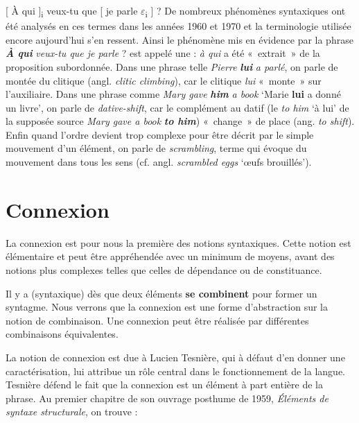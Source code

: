 {    \ea{}
        [ À qui ]{\textsubscript{i}} veux-tu que [ je parle $\varepsilon ${\textsubscript{i}} ] ?
    \z
    De nombreux phénomènes syntaxiques ont été analysés en ces termes dans les années 1960 et 1970 et la terminologie utilisée encore aujourd’hui s’en ressent. Ainsi le phénomène mis en évidence par la phrase \textbf{\textit{À} \textit{qui}} \textit{veux-tu que je parle} ? est appelé une : \textit{à qui} a été «~extrait~» de la proposition subordonnée. Dans une phrase telle \textit{Pierre} \textbf{\textit{lui}} \textit{a parlé}, on parle de montée du clitique (angl. \textit{clitic climbing}), car le clitique \textit{lui} «~monte~» sur l’auxiliaire. Dans une phrase comme \textit{Mary gave} \textbf{\textit{him}} \textit{a book} ‘Marie \textbf{lui} a donné un livre’, on parle de \textit{dative-shift}, car le complément au datif (le \textit{to him} ‘à lui’ de la supposée source \textit{Mary gave a book} \textbf{\textit{to him}}) «~change~» de place (ang. \textit{to shift}). Enfin quand l’ordre devient trop complexe pour être décrit par le simple mouvement d’un élément, on parle de \textit{scrambling}, terme qui évoque du mouvement dans tous les sens (cf. angl. \textit{scrambled eggs} ‘œufs brouillés’).
}
\section{Connexion}\label{sec:3.2.8}

La connexion est pour nous la première des notions syntaxiques. Cette notion est élémentaire et peut être appréhendée avec un minimum de moyens, avant des notions plus complexes telles que celles de dépendance ou de constituance.

\begin{styleLivreImportant}
Il y a  (syntaxique) dès que deux éléments \textbf{se combinent} pour former un syntagme. Nous verrons que la connexion est une forme d’abstraction sur la notion de combinaison. Une connexion peut être réalisée par différentes combinaisons équivalentes.
\end{styleLivreImportant}

La notion de connexion est due à Lucien Tesnière, qui à défaut d’en donner une caractérisation, lui attribue un rôle central dans le fonctionnement de la langue. Tesnière défend le fait que la connexion est un élément à part entière de la phrase. Au premier chapitre de son ouvrage posthume de 1959, \textit{Éléments de syntaxe structurale}, on trouve :

